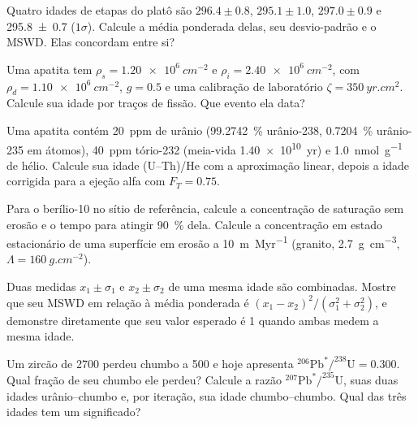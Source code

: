 \begin{exercise}[$\star\star$]\label{exo:b3:advanced-geochronology:6}
Quatro idades de etapas do platô são $296.4 \pm 0.8$, $295.1 \pm 1.0$, $297.0 \pm
0.9$ e \qty[separate-uncertainty=true]{295.8 \pm 0.7}{\Ma} ($1\sigma$). Calcule a média ponderada delas,
seu desvio-padrão e o MSWD. Elas concordam entre si?
\end{exercise}

\begin{exercise}[$\star\star$]\label{exo:b3:advanced-geochronology:7}
Uma apatita tem $\rho_s = \qty{1.20e6}{cm^{-2}}$ e $\rho_i =
\qty{2.40e6}{cm^{-2}}$, com $\rho_d = \qty{1.10e6}{cm^{-2}}$, $g = 0.5$ e uma
calibração de laboratório $\zeta = \qty{350}{yr.cm^2}$. Calcule sua idade por
traços de fissão. Que evento ela data?
\end{exercise}

\begin{exercise}[$\star\star$]\label{exo:b3:advanced-geochronology:8}
Uma apatita contém \qty{20}{ppm} de urânio (\qty{99.2742}{\percent}
urânio-238, \qty{0.7204}{\percent} urânio-235 em átomos), \qty{40}{ppm}
tório-232 (meia-vida \qty{1.40e10}{yr}) e \qty{1.0}{nmol.g^{-1}} de hélio.
Calcule sua idade (U--Th)/He com a aproximação linear, depois a idade
corrigida para a ejeção alfa com $F_T = 0.75$.
\end{exercise}

\begin{exercise}[$\star\star$]\label{exo:b3:advanced-geochronology:9}
Para o berílio-10 no sítio de referência, calcule a concentração de saturação
sem erosão e o tempo para atingir \qty{90}{\percent} dela. Calcule a
concentração em estado estacionário de uma superfície em erosão a \qty{10}{m.Myr^{-1}} (granito,
\qty{2.7}{g.cm^{-3}}, $\Lambda = \qty{160}{g.cm^{-2}}$).
\end{exercise}

\begin{exercise}[$\star\star\star$]\label{exo:b3:advanced-geochronology:10}
Duas medidas $x_1 \pm \sigma_1$ e $x_2 \pm \sigma_2$ de uma mesma idade são
combinadas. Mostre que seu MSWD em relação à média ponderada é
$(x_1 - x_2)^2/(\sigma_1^2 + \sigma_2^2)$, e demonstre diretamente que seu
valor esperado é 1 quando ambas medem a mesma idade.
\end{exercise}

\begin{exercise}[$\star\star\star$]\label{exo:b3:advanced-geochronology:11}
Um zircão de \qty{2700}{\Ma} perdeu chumbo a \qty{500}{\Ma} e hoje apresenta
$^{206}\mathrm{Pb}^*/^{238}\mathrm{U} = 0.300$. Qual fração de seu chumbo ele perdeu?
Calcule a razão $^{207}\mathrm{Pb}^*/^{235}\mathrm{U}$, suas duas idades urânio--chumbo
e, por iteração, sua idade chumbo--chumbo. Qual das três idades tem um
significado?
\end{exercise}


